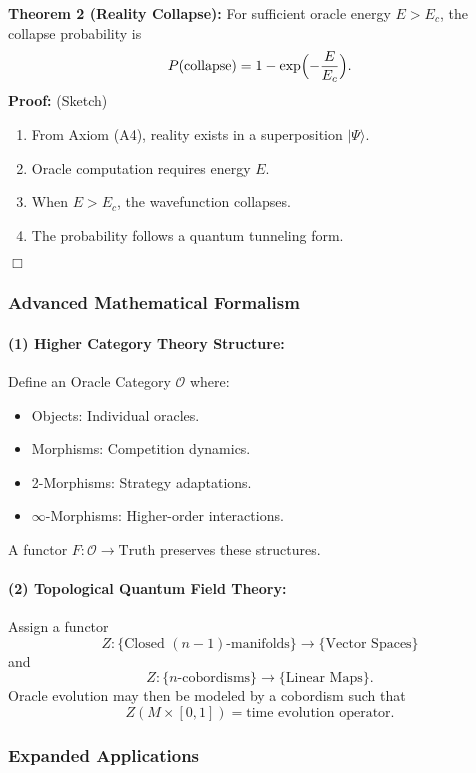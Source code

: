 \documentclass[11pt]{article}
\begin{document}
\bigskip

\textbf{Theorem 2 (Reality Collapse):} For sufficient oracle energy $E>E_c$, the collapse probability is
\[
P(\text{collapse})=1-\exp\Bigl(-\frac{E}{E_c}\Bigr).
\]
\noindent\textbf{Proof:} (Sketch)
\begin{enumerate}[label=(\roman*)]
    \item From Axiom (A4), reality exists in a superposition $|\Psi\rangle$.
    \item Oracle computation requires energy $E$.
    \item When $E>E_c$, the wavefunction collapses.
    \item The probability follows a quantum tunneling form.
\end{enumerate}
\hfill $\Box$

\subsubsection{Advanced Mathematical Formalism}

\paragraph{(1) Higher Category Theory Structure:} 
Define an Oracle Category $\mathcal{O}$ where:
\begin{itemize}
    \item Objects: Individual oracles.
    \item Morphisms: Competition dynamics.
    \item 2-Morphisms: Strategy adaptations.
    \item $\infty$-Morphisms: Higher-order interactions.
\end{itemize}
A functor $F:\mathcal{O}\to\text{Truth}$ preserves these structures.

\paragraph{(2) Topological Quantum Field Theory:} 
Assign a functor
\[
 Z:\{\text{Closed }(n-1)\text{-manifolds}\}\to \{\text{Vector Spaces}\}
\]
and 
\[
Z:\{n\text{-cobordisms}\}\to \{\text{Linear Maps}\}.
\]
Oracle evolution may then be modeled by a cobordism such that
\[
Z(M\times[0,1])=\text{time evolution operator}.
\]

\subsubsection{Expanded Applications}
\end{document}
